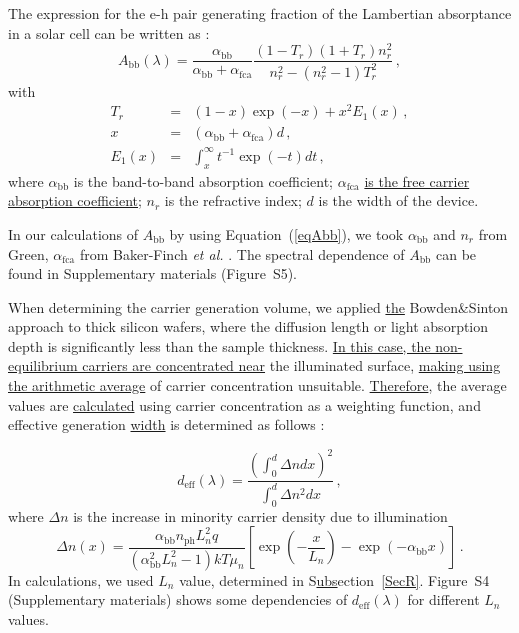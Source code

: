 \documentclass{WileyMSP-template}
\begin{document}
The expression for the e-h pair generating fraction of the Lambertian absorptance in a solar cell
can be written as \cite{Schaefer2018}:
\begin{equation}
\label{eqAbb}
A_\mathrm{bb}(\lambda)=\frac{\alpha_\mathrm{bb}}{\alpha_\mathrm{bb}+\alpha_\mathrm{fca}}\frac{(1-T_r)(1+T_r)n_r^2}{n_r^2-(n_r^2-1)T_r^2}\,,
\end{equation}
with
\begin{eqnarray*}
T_r&=&(1-x)\exp(-x)+x^2E_1(x)\,,\\
x&=&(\alpha_\mathrm{bb}+\alpha_\mathrm{fca})d\,,\\
E_1(x)&=&\int_x^\infty t^{-1}\exp(-t)dt\,,
\end{eqnarray*}
where
$\alpha_\mathrm{bb}$ is the band-to-band absorption coefficient;
$\alpha_\mathrm{fca}$ \textcolor[rgb]{0.00,0.07,1.00}{\uline{is the free carrier absorption coefficient}};
$n_r$ is the refractive index;
$d$ is the width of the device.

In our calculations of $A_\mathrm{bb}$ by using Equation~(\ref{eqAbb}), we took  $\alpha_\mathrm{bb}$ and
$n_r$ from Green\cite{Green2022}, $\alpha_\mathrm{fca}$  from Baker-Finch \emph{et al.} \cite{SiFCA}.
The spectral dependence of \textcolor[rgb]{0.00,0.07,1.00}{\uline{$A_\mathrm{bb}$}} can be found in Supplementary materials (Figure~S5).

When determining the carrier generation volume, we applied \textcolor[rgb]{0.00,0.07,1.00}{\uline{the}} Bowden\&Sinton  approach \cite{Bowden2007} to thick silicon wafers,
where the diffusion length or light absorption depth is significantly less than the sample thickness.
\textcolor[rgb]{0.00,0.07,1.00}{\uline{In this case, the non-equilibrium carriers are concentrated near}} the illuminated surface,
\textcolor[rgb]{0.00,0.07,1.00}{\uline{making using the arithmetic average}} of carrier concentration unsuitable.
\textcolor[rgb]{0.00,0.07,1.00}{\uline{Therefore}}, the average values are \textcolor[rgb]{0.00,0.07,1.00}{\uline{calculated}} using carrier concentration as a weighting function,
and effective generation \textcolor[rgb]{0.00,0.07,1.00}{\uline{width}} is determined as follows \cite{Bowden2007}:

\begin{equation}
\label{eqdeff}
d_\mathrm{eff}(\lambda)=\frac{\left(\int_0^d \Delta n dx\right)^2}{\int_0^d \Delta n^2 dx}\,,
\end{equation}
where
$\Delta n$ is the increase in minority carrier density due to illumination
\begin{equation}
\label{eqdeln}
\Delta n (x)=\frac{\alpha_\mathrm{bb} n_\mathrm{ph} L_n^2 q}{(\alpha_\mathrm{bb}^2 L_n^2-1)kT\mu_n}
\left[\exp\left(-\frac{x}{L_n}\right)-\exp\left(-\alpha_\mathrm{bb} x\right)\right]\,.
\end{equation}
In calculations, we used $L_n$ value, determined in S\textcolor[rgb]{0.00,0.07,1.00}{\uline{ubs}}ection~\ref{SecR}.
Figure~S4 (Supplementary materials) shows some dependencies of $d_\mathrm{eff}(\lambda)$ for different $L_n$ values.
\end{document}
